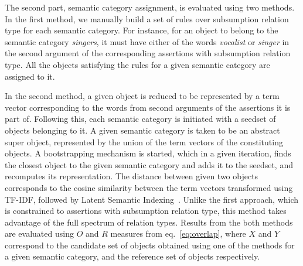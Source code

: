 \documentclass{llncs}
\begin{document}
The second part, semantic category assignment, is evaluated using two methods. In the first method, we manually build a set of rules over subsumption relation type for each semantic category. For instance, for an object to belong to the semantic category \textit{singers}, it must have either of the words \textit{vocalist} or \textit{singer} in the second argument of the corresponding assertions with subsumption relation type. All the objects satisfying the rules for a given semantic category are assigned to it.

In the second method, a given object is reduced to be represented by a term vector corresponding to the words from second arguments of the assertions it is part of. Following this, each semantic category is initiated with a seedset of objects belonging to it. A given semantic category is taken to be an abstract super object, represented by the union of the term vectors of the constituting objects. A bootstrapping mechanism is started, which in a given iteration, finds the closest object to the given semantic category and adds it to the seedset, and recomputes its representation. The distance between given two objects corresponds to the cosine similarity between the term vectors transformed using TF-IDF, followed by Latent Semantic Indexing~\cite{rehurek_lrec}. Unlike the first approach, which is constrained to assertions with subsumption relation type, this method takes advantage of the full spectrum of relation types. Results from the both methods are evaluated using $O$ and $R$ measures from eq.~\ref{eq:overlap}, where $X$ and $Y$ correspond to the candidate set of objects obtained using one of the methods for a given semantic category, and the reference set of objects respectively.
\end{document}

